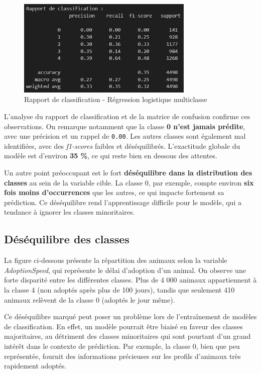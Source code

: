\documentclass[a4paper,12pt]{article}
\begin{document}
\begin{figure}[H]
    \centering
    \includegraphics[width=0.75\textwidth]{classification_report_logreg.png}
    \caption{Rapport de classification - Régression logistique multiclasse}
    \label{fig:classification_logreg}
\end{figure}

L’analyse du rapport de classification et de la matrice de confusion confirme ces observations. On remarque notamment que la classe \textbf{0 n’est jamais prédite}, avec une précision et un rappel de \texttt{0.00}. Les autres classes sont également mal identifiées, avec des \textit{f1-scores} faibles et déséquilibrés. L’exactitude globale du modèle est d’environ \textbf{35 \%}, ce qui reste bien en dessous des attentes.

Un autre point préoccupant est le fort \textbf{déséquilibre dans la distribution des classes} au sein de la variable cible. La classe 0, par exemple, compte environ \textbf{six fois moins d’occurrences} que les autres, ce qui impacte fortement sa prédiction. Ce déséquilibre rend l’apprentissage difficile pour le modèle, qui a tendance à ignorer les classes minoritaires.

\subsection{Déséquilibre des classes}

La figure ci-dessous présente la répartition des animaux selon la variable \textit{AdoptionSpeed}, qui représente le délai d’adoption d’un animal. On observe une forte disparité entre les différentes classes. Plus de 4 000 animaux appartiennent à la classe 4 (non adoptés après plus de 100 jours), tandis que seulement 410 animaux relèvent de la classe 0 (adoptés le jour même).

Ce déséquilibre marqué peut poser un problème lors de l'entraînement de modèles de classification. En effet, un modèle pourrait être biaisé en faveur des classes majoritaires, au détriment des classes minoritaires qui sont pourtant d’un grand intérêt dans le contexte de prédiction. Par exemple, la classe 0, bien que peu représentée, fournit des informations précieuses sur les profils d’animaux très rapidement adoptés.
\end{document}
